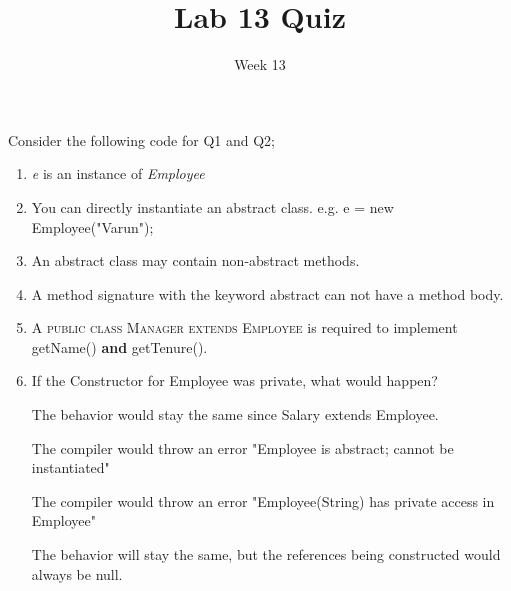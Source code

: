 \documentclass[addpoints]{exam}
\title{Lab 13 Quiz}
\date{Week 13}
\begin{document}
 

\Instructions
\hspace{0.5em}Consider the following code for Q1 and Q2;
\begin{enumerate}
\begin{lstlisting}
abstract class Employee {
	private String name;
	public Employee(String name) {
		this.name = name;
	}
	public String getName() {
	    return name;
	}
	public abstract int getTenure();
}
class Salary extends Employee {
	private int tenure;
	public Salary(String name, int tenure) {
		super(name);
		this.tenure = tenure;
	}
	public int getTenure() {
	    return this.tenure
	}
} 
public class AbstractTest {
	public static void main(String[] args) {
		Employee e = new Salary("Sahil", 999999);
	}
}
\end{lstlisting}
\item {} \tf  \textit{e} is an instance of \textit{Employee}
\newline

\item {} \tf  You can directly instantiate an abstract class. e.g. e = new Employee("Varun");
\newline


\item {} \tf  An abstract class may contain non-abstract methods.
\newline

\item {} \tf  A method signature with the keyword abstract can not have a method body.
\newline

\item {} \tf  A \textsc{public class Manager extends Employee} is required to implement getName() \textbf{and} getTenure().
\newline

\item {}
If the Constructor for Employee was private, what would happen?

\begin{oneparchoices} 
\hspace{0.2cm}
 
 \choice  The behavior would stay the same since Salary extends Employee. \newline
 
 \choice The compiler would throw an error "Employee is abstract; cannot be instantiated" \newline
 
 \choice The compiler would throw an error "Employee(String) has private access in Employee"\newline
 
 \choice The behavior will stay the same, but the references being constructed would always be null. \newline
 \end{oneparchoices}




\vspace{2em}
\end{enumerate}
\end{document}
